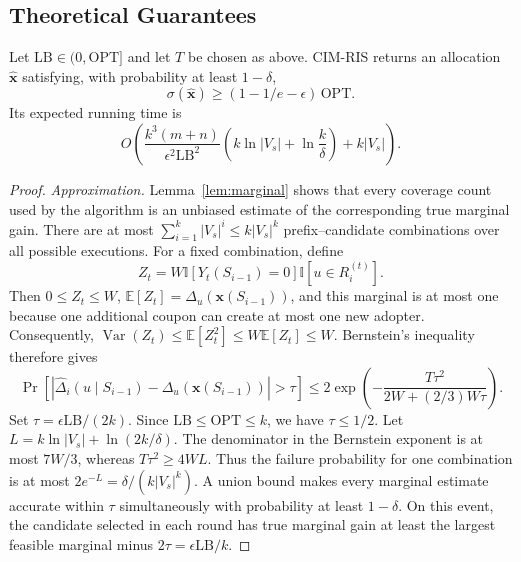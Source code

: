 \documentclass[sigconf,balance=false]{acmart}
\newcommand{\CIMRIS}{\textsc{CIM-RIS}}
\newcommand{\E}{\mathbb{E}}
\newcommand{\I}{\mathbb{I}}
\begin{document}
\subsection{Theoretical Guarantees}

\begin{theorem}
\label{thm:approx}
Let $\mathrm{LB}\in(0,\mathrm{OPT}]$ and let $T$ be chosen as above.
\CIMRIS{} returns an allocation $\hat{\bm{x}}$ satisfying, with
probability at least $1-\delta$,
\[
  \sigma(\hat{\bm{x}})
  \geq (1-1/e-\epsilon)\,\mathrm{OPT}.
\]
Its expected running time is
\[
  O\!\left(
    \frac{k^3(m+n)}{\epsilon^2\mathrm{LB}^2}
    \left(k\ln |V_s|+\ln\frac{k}{\delta}\right)
    +k|V_s|
  \right).
\]
\end{theorem}

\begin{proof}
\textit{Approximation.}
Lemma~\ref{lem:marginal} shows that every coverage count used by the
algorithm is an unbiased estimate of the corresponding true marginal
gain.
There are at most
$\sum_{i=1}^k |V_s|^i\leq k|V_s|^k$ prefix--candidate combinations over
all possible executions.
For a fixed combination, define
\[
  Z_t=W\I[Y_t(S_{i-1})=0]\I[u\in R_i^{(t)}].
\]
Then $0\leq Z_t\leq W$, $\E[Z_t]=\Delta_u(\bm{x}(S_{i-1}))$,
and this marginal is at most one because one additional coupon can
create at most one new adopter.
Consequently,
$\operatorname{Var}(Z_t)\leq\E[Z_t^2]\leq W\E[Z_t]\leq W$.
Bernstein's inequality therefore gives
\[
  \Pr\!\left[
    |\widehat{\Delta}_i(u\mid S_{i-1})
      -\Delta_u(\bm{x}(S_{i-1}))|>\tau
  \right]
  \leq
  2\exp\!\left(
    -\frac{T\tau^2}{2W+(2/3)W\tau}
  \right).
\]
Set $\tau=\epsilon\mathrm{LB}/(2k)$.
Since $\mathrm{LB}\leq\mathrm{OPT}\leq k$, we have $\tau\leq1/2$.
Let $L=k\ln|V_s|+\ln(2k/\delta)$.
The denominator in the Bernstein exponent is at most $7W/3$, whereas
$T\tau^2\geq4WL$.
Thus the failure probability for one combination is at most
$2e^{-L}=\delta/(k|V_s|^k)$.
A union bound makes every marginal estimate accurate within $\tau$
simultaneously with probability at least $1-\delta$.
On this event, the candidate selected in each round has true marginal
gain at least the largest feasible marginal minus
$2\tau=\epsilon\mathrm{LB}/k$.


\end{proof}
\end{document}
